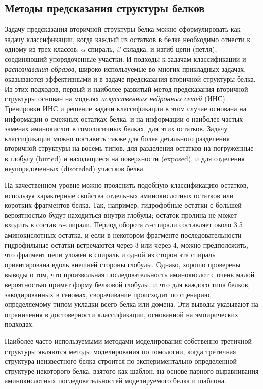 \subsection{Методы предсказания структуры белков}

Задачу предсказания вторичной структуры белка можно сформулировать как задачу классификации, когда каждый из остатков в белке необходимо отнести к одному из трех классов: $\alpha$-спираль, $\beta$-складка, и изгиб цепи (петля), соединяющий упорядоченные участки. И подходы к задачам классификации и \textit{распознавания образов}, широко используемые во многих прикладных задачах, оказываются эффективными и в задаче предсказания вторичной структуры белка. Из этих подходов, первый и наиболее развитый метод предсказания вторичной структуры основан на моделях \textit{искусственных нейронных сетей} (ИНС). Тренировки ИНС и решение задачи классификации в этом случае основана на информации о смежных остатках белка, и на информации о наиболее частых заменах аминокислот в гомологичных белках, для этих остатков. Задачу классификации можно поставить также для более детального разделения вторичной структуры на восемь типов, для разделения остатков на погруженные в глобулу (buried) и находящиеся на поверхности (exposed), и для отделения неупорядоченных (disoreded) участков белка. 

На качественном уровне можно прояснить подобную классификацию остатков, используя характерные свойства отдельных аминокислотных остатков или коротких фрагментов белка. Так, например, гидрофобные остатки с большей вероятностью будут находиться внутри глобулы; остаток пролина не может входить в состав $\alpha$-спирали. Период оборота $\alpha$-спирали составляет около 3.5 аминокислотных остатка, и если в некотором фрагменте последовательности гидрофильные остатки встречаются через 3 или через 4, можно предположить, что фрагмент цепи уложен в спираль и одной из сторон эта спираль ориентирована вдоль внешней стороны глобулы. Однако, хорошо проверены выводы о том, что произвольная последовательность аминокислот с очень малой вероятностью примет форму белковой глобулы, и что для каждого типа белков, закодированных в геномах, сворачивание происходит по сценарию, определяемому типом укладки всего белка или домена. Эти выводы указывают на ограничения в достоверности классификации, основанной на эмпирических подходах.

Наиболее часто используемыми методами моделирования собственно третичной структуры являются методы моделирования по гомологии, когда третичная структура неизвестного белка строится по экспериментально определенной структуре некоторого белка, взятого как шаблон, на основе парного выравнивания аминокислотных последовательностей моделируемого белка и шаблона. 

